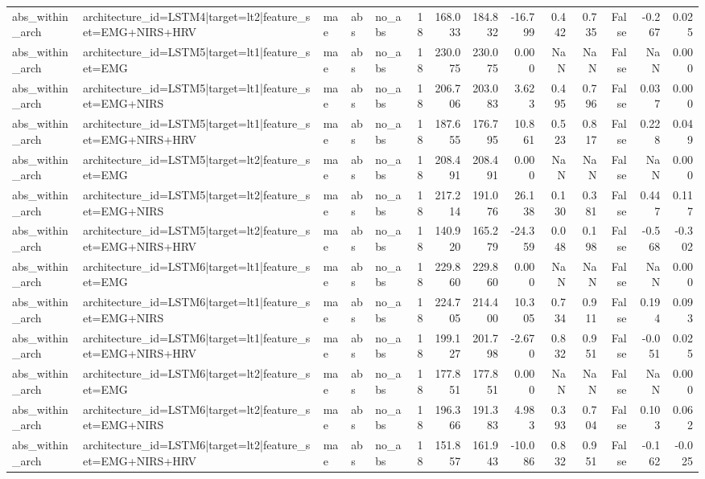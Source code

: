 \begin{table}
\begin{tabular}{lllllrrrrrrrrr}
abs_within_arch & architecture_id=LSTM4|target=lt2|feature_set=EMG+NIRS+HRV & mae & abs & no_abs & 18 & 168.033 & 184.832 & -16.799 & 0.442 & 0.735 & False & -0.267 & 0.025 \\
abs_within_arch & architecture_id=LSTM5|target=lt1|feature_set=EMG & mae & abs & no_abs & 18 & 230.075 & 230.075 & 0.000 & NaN & NaN & False & NaN & 0.000 \\
abs_within_arch & architecture_id=LSTM5|target=lt1|feature_set=EMG+NIRS & mae & abs & no_abs & 18 & 206.706 & 203.083 & 3.623 & 0.495 & 0.796 & False & 0.037 & 0.000 \\
abs_within_arch & architecture_id=LSTM5|target=lt1|feature_set=EMG+NIRS+HRV & mae & abs & no_abs & 18 & 187.655 & 176.795 & 10.861 & 0.523 & 0.817 & False & 0.228 & 0.049 \\
abs_within_arch & architecture_id=LSTM5|target=lt2|feature_set=EMG & mae & abs & no_abs & 18 & 208.491 & 208.491 & 0.000 & NaN & NaN & False & NaN & 0.000 \\
abs_within_arch & architecture_id=LSTM5|target=lt2|feature_set=EMG+NIRS & mae & abs & no_abs & 18 & 217.214 & 191.076 & 26.138 & 0.130 & 0.381 & False & 0.447 & 0.117 \\
abs_within_arch & architecture_id=LSTM5|target=lt2|feature_set=EMG+NIRS+HRV & mae & abs & no_abs & 18 & 140.920 & 165.279 & -24.359 & 0.048 & 0.198 & False & -0.568 & -0.302 \\
abs_within_arch & architecture_id=LSTM6|target=lt1|feature_set=EMG & mae & abs & no_abs & 18 & 229.860 & 229.860 & 0.000 & NaN & NaN & False & NaN & 0.000 \\
abs_within_arch & architecture_id=LSTM6|target=lt1|feature_set=EMG+NIRS & mae & abs & no_abs & 18 & 224.705 & 214.400 & 10.305 & 0.734 & 0.911 & False & 0.194 & 0.093 \\
abs_within_arch & architecture_id=LSTM6|target=lt1|feature_set=EMG+NIRS+HRV & mae & abs & no_abs & 18 & 199.127 & 201.798 & -2.670 & 0.832 & 0.951 & False & -0.051 & 0.025 \\
abs_within_arch & architecture_id=LSTM6|target=lt2|feature_set=EMG & mae & abs & no_abs & 18 & 177.851 & 177.851 & 0.000 & NaN & NaN & False & NaN & 0.000 \\
abs_within_arch & architecture_id=LSTM6|target=lt2|feature_set=EMG+NIRS & mae & abs & no_abs & 18 & 196.366 & 191.383 & 4.983 & 0.393 & 0.704 & False & 0.103 & 0.062 \\
abs_within_arch & architecture_id=LSTM6|target=lt2|feature_set=EMG+NIRS+HRV & mae & abs & no_abs & 18 & 151.857 & 161.943 & -10.086 & 0.832 & 0.951 & False & -0.162 & -0.025 \\

\end{tabular}
\end{table}
